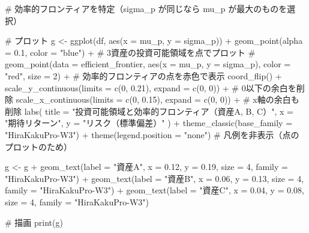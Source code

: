 \documentclass[
  letterpaper,
  pandoc,
  ja=standard,
  jafont = hiragino-pron]{ltjsbook}
\newenvironment{Shaded}{\begin{snugshade}}{\end{snugshade}}
\newcommand{\AttributeTok}[1]{\textcolor[rgb]{0.40,0.45,0.13}{#1}}
\newcommand{\CommentTok}[1]{\textcolor[rgb]{0.37,0.37,0.37}{#1}}
\newcommand{\DecValTok}[1]{\textcolor[rgb]{0.68,0.00,0.00}{#1}}
\newcommand{\FloatTok}[1]{\textcolor[rgb]{0.68,0.00,0.00}{#1}}
\newcommand{\FunctionTok}[1]{\textcolor[rgb]{0.28,0.35,0.67}{#1}}
\newcommand{\NormalTok}[1]{\textcolor[rgb]{0.00,0.23,0.31}{#1}}
\newcommand{\OtherTok}[1]{\textcolor[rgb]{0.00,0.23,0.31}{#1}}
\newcommand{\SpecialCharTok}[1]{\textcolor[rgb]{0.37,0.37,0.37}{#1}}
\newcommand{\StringTok}[1]{\textcolor[rgb]{0.13,0.47,0.30}{#1}}
\begin{document}
\begin{Shaded}
\begin{Highlighting}[]
\CommentTok{\# 効率的フロンティアを特定（sigma\_p が同じなら mu\_p が最大のものを選択）}

\CommentTok{\# プロット}
\NormalTok{g }\OtherTok{\textless{}{-}} \FunctionTok{ggplot}\NormalTok{(df, }\FunctionTok{aes}\NormalTok{(}\AttributeTok{x =}\NormalTok{ mu\_p, }\AttributeTok{y =}\NormalTok{ sigma\_p)) }\SpecialCharTok{+}
  \FunctionTok{geom\_point}\NormalTok{(}\AttributeTok{alpha =} \FloatTok{0.1}\NormalTok{, }\AttributeTok{color =} \StringTok{"blue"}\NormalTok{) }\SpecialCharTok{+}  \CommentTok{\# 3資産の投資可能領域を点でプロット}
  \CommentTok{\# geom\_point(data = efficient\_frontier, aes(x = mu\_p, y = sigma\_p), color = "red", size = 2) +  \# 効率的フロンティアの点を赤色で表示}
  \FunctionTok{coord\_flip}\NormalTok{() }\SpecialCharTok{+}
  \FunctionTok{scale\_y\_continuous}\NormalTok{(}\AttributeTok{limits =} \FunctionTok{c}\NormalTok{(}\DecValTok{0}\NormalTok{, }\FloatTok{0.21}\NormalTok{), }\AttributeTok{expand =} \FunctionTok{c}\NormalTok{(}\DecValTok{0}\NormalTok{, }\DecValTok{0}\NormalTok{)) }\SpecialCharTok{+}  \CommentTok{\# 0以下の余白を削除}
  \FunctionTok{scale\_x\_continuous}\NormalTok{(}\AttributeTok{limits =} \FunctionTok{c}\NormalTok{(}\DecValTok{0}\NormalTok{, }\FloatTok{0.15}\NormalTok{), }\AttributeTok{expand =} \FunctionTok{c}\NormalTok{(}\DecValTok{0}\NormalTok{, }\DecValTok{0}\NormalTok{)) }\SpecialCharTok{+} \CommentTok{\# x軸の余白も削除}
  \FunctionTok{labs}\NormalTok{(}
    \AttributeTok{title =} \StringTok{"投資可能領域と効率的フロンティア（資産A, B, C）"}\NormalTok{,}
    \AttributeTok{x =} \StringTok{"期待リターン"}\NormalTok{,}
    \AttributeTok{y =} \StringTok{"リスク（標準偏差）"}
\NormalTok{  ) }\SpecialCharTok{+}
  \FunctionTok{theme\_classic}\NormalTok{(}\AttributeTok{base\_family =} \StringTok{"HiraKakuPro{-}W3"}\NormalTok{) }\SpecialCharTok{+}
  \FunctionTok{theme}\NormalTok{(}\AttributeTok{legend.position =} \StringTok{"none"}\NormalTok{)  }\CommentTok{\# 凡例を非表示（点のプロットのため）}

\NormalTok{g }\OtherTok{\textless{}{-}}\NormalTok{ g }\SpecialCharTok{+}
  \FunctionTok{geom\_text}\NormalTok{(}\AttributeTok{label =} \StringTok{"資産A"}\NormalTok{, }\AttributeTok{x =} \FloatTok{0.12}\NormalTok{, }\AttributeTok{y =} \FloatTok{0.19}\NormalTok{, }\AttributeTok{size =} \DecValTok{4}\NormalTok{, }\AttributeTok{family =} \StringTok{"HiraKakuPro{-}W3"}\NormalTok{) }\SpecialCharTok{+}
  \FunctionTok{geom\_text}\NormalTok{(}\AttributeTok{label =} \StringTok{"資産B"}\NormalTok{, }\AttributeTok{x =} \FloatTok{0.06}\NormalTok{, }\AttributeTok{y =} \FloatTok{0.13}\NormalTok{, }\AttributeTok{size =} \DecValTok{4}\NormalTok{, }\AttributeTok{family =} \StringTok{"HiraKakuPro{-}W3"}\NormalTok{) }\SpecialCharTok{+}
  \FunctionTok{geom\_text}\NormalTok{(}\AttributeTok{label =} \StringTok{"資産C"}\NormalTok{, }\AttributeTok{x =} \FloatTok{0.04}\NormalTok{, }\AttributeTok{y =} \FloatTok{0.08}\NormalTok{, }\AttributeTok{size =} \DecValTok{4}\NormalTok{, }\AttributeTok{family =} \StringTok{"HiraKakuPro{-}W3"}\NormalTok{)}

\CommentTok{\# 描画}
\FunctionTok{print}\NormalTok{(g)}
\end{Highlighting}
\end{Shaded}
\end{document}
